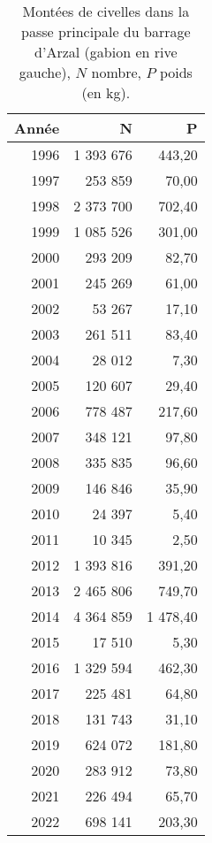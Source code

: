 \begin{table}[htbp]
\centering
\begin{tabular}{rrr}
  \hline
Année & N & P \\ 
  \hline
1996 & 1 393 676 & 443,20 \\ 
  1997 & 253 859 & 70,00 \\ 
  1998 & 2 373 700 & 702,40 \\ 
  1999 & 1 085 526 & 301,00 \\ 
  2000 & 293 209 & 82,70 \\ 
  2001 & 245 269 & 61,00 \\ 
  2002 & 53 267 & 17,10 \\ 
  2003 & 261 511 & 83,40 \\ 
  2004 & 28 012 & 7,30 \\ 
  2005 & 120 607 & 29,40 \\ 
  2006 & 778 487 & 217,60 \\ 
  2007 & 348 121 & 97,80 \\ 
  2008 & 335 835 & 96,60 \\ 
  2009 & 146 846 & 35,90 \\ 
  2010 & 24 397 & 5,40 \\ 
  2011 & 10 345 & 2,50 \\ 
  2012 & 1 393 816 & 391,20 \\ 
  2013 & 2 465 806 & 749,70 \\ 
  2014 & 4 364 859 & 1 478,40 \\ 
  2015 & 17 510 & 5,30 \\ 
  2016 & 1 329 594 & 462,30 \\ 
  2017 & 225 481 & 64,80 \\ 
  2018 & 131 743 & 31,10 \\ 
  2019 & 624 072 & 181,80 \\ 
  2020 & 283 912 & 73,80 \\ 
  2021 & 226 494 & 65,70 \\ 
  2022 & 698 141 & 203,30 \\ 
   \hline
\end{tabular}
\caption{Montées de civelles dans la passe principale du barrage d'Arzal (gabion en rive gauche), $N$ nombre,
				$P$ poids (en kg).} 
\label{table_civelle_6}
\end{table}
